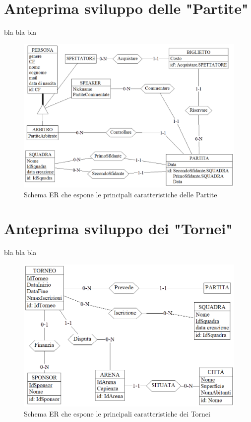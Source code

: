 \documentclass[a4paper,12pt]{report}
\begin{document}
\section{Anteprima sviluppo delle "Partite"}
bla bla bla
\begin{figure}[!htb]
	\centerline{\includegraphics[scale=0.6]{img/ER_Partite.png}}
	\caption{Schema ER che espone le principali caratteristiche delle Partite}
	\label{img:ER_Partite}
\end{figure}
\section{Anteprima sviluppo dei "Tornei"}
bla bla bla
\begin{figure}[!htb]
	\centerline{\includegraphics[scale=0.7]{img/ER_Tornei.png}}
	\caption{Schema ER che espone le principali caratteristiche dei Tornei}
	\label{img:ER_Tornei}
\end{figure}
\end{document}
